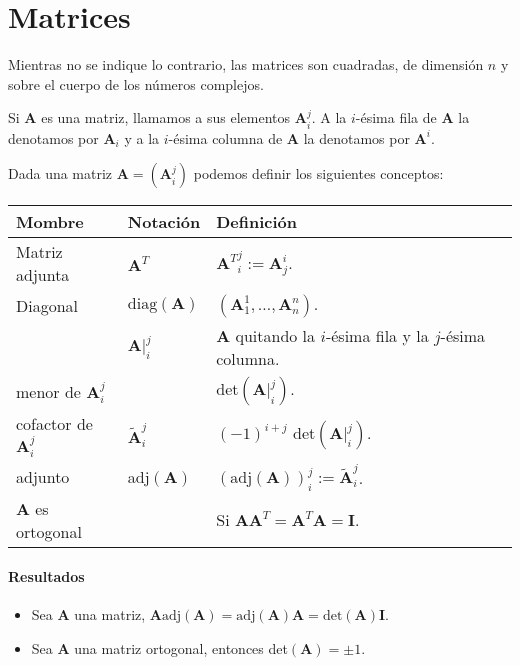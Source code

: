 
\section{Matrices}

Mientras no se indique lo contrario, las matrices son cuadradas, de dimensión $n$ y sobre el cuerpo de los números complejos.

Si $\mathbf{A}$ es una matriz, llamamos a sus elementos $\mathbf{A}_i^j$. A la $i$-ésima fila de $\mathbf{A}$ la denotamos por $\mathbf{A}_i$ y a la $i$-ésima columna de $\mathbf{A}$ la denotamos por $\mathbf{A}^i$.

Dada una matriz $\mathbf{A}=(\mathbf{A}_i^j)$ podemos definir los siguientes conceptos:
\begin{tabular}{l|l|l}
	Mombre & Notación & Definición \\
	\hline
	Matriz adjunta & $\mathbf{A}^T$ & ${\mathbf{A}^T}_i^j := \mathbf{A}_j^i$. \\
	Diagonal & $\text{diag}(\mathbf{A})$ & $(\mathbf{A}_1^1, \dots, \mathbf{A}_n^n)$. \\
	& $\mathbf{A}|_i^j$ & $\mathbf{A}$ quitando la $i$-ésima fila y la $j$-ésima columna. \\
	menor de $\mathbf{A}_i^j$ & & det$(\mathbf{A}|_i^j)$. \\
	cofactor de $\mathbf{A}_i^j$ & $\mathbf{\tilde{A}}_i^j$ & $(-1)^{i+j}$ det$(\mathbf{A}|_i^j)$. \\
	adjunto & adj$(\mathbf{A})$ & $(\text{adj}(\mathbf{A}))_i^j := \mathbf{\tilde{A}}_i^j$. \\
	$\mathbf{A}$ es ortogonal & & Si $\mathbf{A}\mathbf{A}^T=\mathbf{A}^T\mathbf{A}=\mathbf{I}$.
\end{tabular}

\paragraph{Resultados}
\begin{itemize}
	\item Sea $\mathbf{A}$ una matriz, $\mathbf{A}\text{adj}(\mathbf{A}) = \text{adj}(\mathbf{A})\mathbf{A}=\text{det}(\mathbf{A})\mathbf{I}$.
	\item Sea $\mathbf{A}$ una matriz ortogonal, entonces det$(\mathbf{A})=\pm1$.
\end{itemize}
